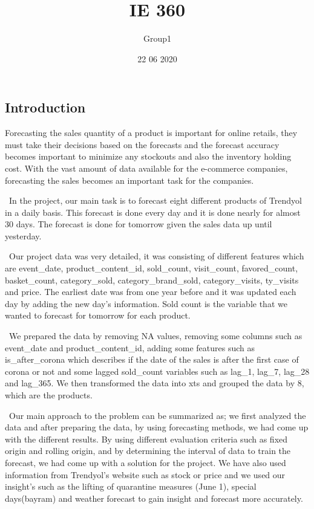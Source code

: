 \documentclass[]{article}
\title{IE 360}
\author{Group1}
\date{22 06 2020}
\begin{document}
\maketitle

\hypertarget{introduction}{%
\subsection{Introduction}\label{introduction}}

Forecasting the sales quantity of a product is important for online
retails, they must take their decisions based on the forecasts and the
forecast accuracy becomes important to minimize any stockouts and also
the inventory holding cost. With the vast amount of data available for
the e-commerce companies, forecasting the sales becomes an important
task for the companies.

~In the project, our main task is to forecast eight different products
of Trendyol in a daily basis. This forecast is done every day and it is
done nearly for almost 30 days. The forecast is done for tomorrow given
the sales data up until yesterday.

~Our project data was very detailed, it was consisting of different
features which are event\_date, product\_content\_id, sold\_count,
visit\_count, favored\_count, basket\_count, category\_sold,
category\_brand\_sold, category\_visits, ty\_visits and price. The
earliest date was from one year before and it was updated each day by
adding the new day's information. Sold count is the variable that we
wanted to forecast for tomorrow for each product.

~We prepared the data by removing NA values, removing some columns such
as event\_date and product\_content\_id, adding some features such as
is\_after\_corona which describes if the date of the sales is after the
first case of corona or not and some lagged sold\_count variables such
as lag\_1, lag\_7, lag\_28 and lag\_365. We then transformed the data
into xts and grouped the data by 8, which are the products.

~Our main approach to the problem can be summarized as; we first
analyzed the data and after preparing the data, by using forecasting
methods, we had come up with the different results. By using different
evaluation criteria such as fixed origin and rolling origin, and by
determining the interval of data to train the forecast, we had come up
with a solution for the project. We have also used information from
Trendyol's website such as stock or price and we used our insight's such
as the lifting of quarantine measures (June 1), special days(bayram) and
weather forecast to gain insight and forecast more accurately.
\end{document}

